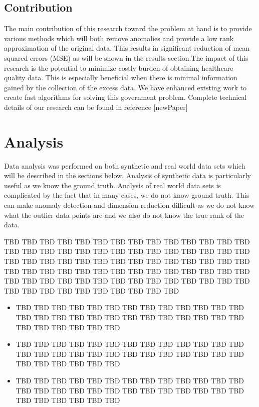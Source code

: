 \documentclass[conference]{IEEEtran}
\begin{document}
\subsection{Contribution}
The main contribution of this research toward the problem at hand is to provide various methods which will both remove anomalies and provide a low rank approximation of the original data.  This results in significant reduction of mean squared errors (MSE) as will be shown in the results section.The impact of this research is the potential to minimize costly burden of obtaining healthcare quality data. This is especially beneficial when there is minimal information gained by the collection of the excess data. We have enhanced existing work to create fast algorithms for solving this government problem. Complete technical details of our research can be found in reference [newPaper]
\section{Analysis}

Data analysis was performed on both synthetic and real world data sets which will be described in the sections below. Analysis of synthetic data is particularly useful as we know the ground truth. Analysis of real world data sets is complicated by the fact that in many cases, we do not know ground truth.  This can make anomaly detection and dimension reduction difficult as we do not know what the outlier data points are and we also do not know the true rank of the data. 

TBD TBD TBD TBD TBD TBD TBD TBD TBD TBD TBD TBD TBD TBD TBD TBD
TBD TBD TBD TBD TBD TBD TBD TBD TBD TBD TBD TBD TBD TBD TBD TBD
TBD TBD TBD TBD TBD TBD TBD TBD TBD TBD TBD TBD TBD TBD TBD TBD
TBD TBD TBD TBD TBD TBD TBD TBD TBD TBD TBD TBD TBD TBD TBD TBD
TBD TBD TBD TBD TBD TBD TBD TBD TBD TBD TBD TBD TBD TBD TBD TBD

\begin{itemize}
\item TBD TBD TBD TBD TBD TBD TBD TBD TBD TBD TBD TBD TBD TBD TBD TBD
TBD TBD TBD TBD TBD TBD TBD TBD TBD TBD TBD TBD TBD TBD TBD TBD
\item TBD TBD TBD TBD TBD TBD TBD TBD TBD TBD TBD TBD TBD TBD TBD TBD
TBD TBD TBD TBD TBD TBD TBD TBD TBD TBD TBD TBD TBD TBD TBD TBD
\item TBD TBD TBD TBD TBD TBD TBD TBD TBD TBD TBD TBD TBD TBD TBD TBD
TBD TBD TBD TBD TBD TBD TBD TBD TBD TBD TBD TBD TBD TBD TBD TBD
\end{itemize}
\end{document}
